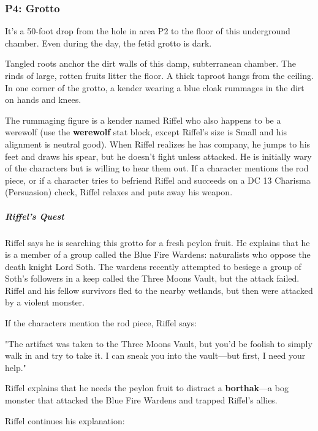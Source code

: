 \documentclass[10pt,a4paper,twoside,bg=print,twocolumn,openany,nodeprecatedcode]{dndbook}
\begin{document}
\subsubsection{P4: Grotto}
It's a 50-foot drop from the hole in area P2 to the floor of this underground chamber. Even during the day, the fetid grotto is dark.

\begin{DndReadAloud}{}
Tangled roots anchor the dirt walls of this damp, subterranean chamber. The rinds of large, rotten fruits litter the floor. A thick taproot hangs from the ceiling. In one corner of the grotto, a kender wearing a blue cloak rummages in the dirt on hands and knees.

\end{DndReadAloud}

The rummaging figure is a kender named Riffel who also happens to be a werewolf (use the \textbf{werewolf} stat block, except Riffel's size is Small and his alignment is neutral good). When Riffel realizes he has company, he jumps to his feet and draws his spear, but he doesn't fight unless attacked. He is initially wary of the characters but is willing to hear them out. If a character mentions the rod piece, or if a character tries to befriend Riffel and succeeds on a DC 13 Charisma (Persuasion) check, Riffel relaxes and puts away his weapon.

\subparagraph{Riffel's Quest}
Riffel says he is searching this grotto for a fresh peylon fruit. He explains that he is a member of a group called the Blue Fire Wardens: naturalists who oppose the death knight Lord Soth. The wardens recently attempted to besiege a group of Soth's followers in a keep called the Three Moons Vault, but the attack failed. Riffel and his fellow survivors fled to the nearby wetlands, but then were attacked by a violent monster.

If the characters mention the rod piece, Riffel says:

\begin{DndReadAloud}{}
"The artifact was taken to the Three Moons Vault, but you'd be foolish to simply walk in and try to take it. I can sneak you into the vault—but first, I need your help."

\end{DndReadAloud}

Riffel explains that he needs the peylon fruit to distract a \textbf{borthak}—a bog monster that attacked the Blue Fire Wardens and trapped Riffel's allies.

Riffel continues his explanation:
\end{document}
